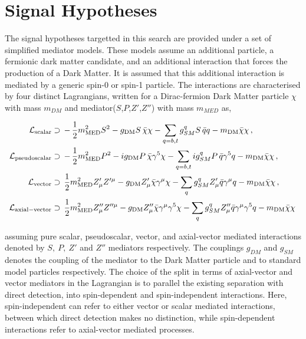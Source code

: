 \section{Signal Hypotheses}
The signal hypotheses targetted in this search are provided under a set of simplified mediator models. These models assume an additional particle, 
a fermionic dark matter candidate, and an additional interaction that forces the production of a Dark Matter. 
It is assumed that this additional interaction is mediated by a generic spin-0 or spin-1 particle. 
The interactions are characterised by four distinct Lagrangians,
written for a Dirac-fermion Dark Matter particle $\chi$ with mass
$m_{DM}$ and mediator($S$,$P$,$Z'$,$Z''$) with mass $m_{MED}$ as, 

\begin{align}
\label{eq:LS} 
\mathcal{L}_{\mathrm{scalar}}&\supset\, -\,\frac{1}{2}m_{\rm MED}^2 S^2 - g_{\rm DM}  S \, \bar{\chi}\chi
 - \sum_{q=b,t} g_{SM}^q S \, \bar{q}q  - m_{\rm DM} \bar{\chi}\chi \,,
 \\
 \label{eq:LP} 
\mathcal{L}_{\rm{pseudoscalar}}&\supset\, -\,\frac{1}{2}m_{\rm MED}^2 P^2 - i g_{\rm DM}  P \, \bar{\chi} \gamma^5\chi
 -\sum_{q=b,t}  i g_{SM}^q  P \, \bar{q}  \gamma^5q  - m_{\rm DM} \bar{\chi}\chi\,,
 \\
 \label{eq:LV} 
\mathcal{L}_{\mathrm{vector}}&\supset \, \frac{1}{2}m_{\rm MED}^2 Z'_{\mu} Z'^{\mu} - g_{\rm DM}Z'_{\mu} \bar{\chi}\gamma^{\mu}\chi -\sum_q g_{SM}^q Z'_{\mu} \bar{q}\gamma^{\mu}q - m_{\rm DM} \bar{\chi}\chi\,,
 \\
 \label{eq:LA} 
\mathcal{L}_{\rm{axial-vector}}&\supset\,  \frac{1}{2}m_{\rm MED}^2 Z''_{\mu} Z''^{\mu} - g_{\rm DM} Z''_{\mu} \bar{\chi}\gamma^{\mu}\gamma^5\chi -\sum_q g_{SM}^q Z''_{\mu} \bar{q}\gamma^{\mu}\gamma^5q - m_{\rm DM} \bar{\chi}\chi\,
\end{align}

assuming pure scalar, pseudoscalar, vector, and axial-vector mediated interactions denoted by $S,~P,~Z'$ and $Z''$ mediators respectively. 
The couplings $g_{DM}$ and $g_{SM}$ denotes the coupling of the mediator to the Dark Matter particle and to standard model particles respectively. 
The choice of the split in terms of axial-vector and vector mediators in the Lagrangian is to parallel the existing separation with direct detection, into spin-dependent and spin-independent interactions. Here, spin-independent can refer to either vector or scalar mediated interactions, between which direct detection makes no distinction, while 
spin-dependent interactions refer to axial-vector mediated processes.
 
